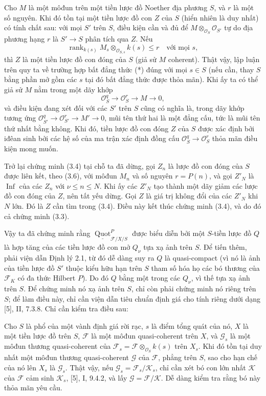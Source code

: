  Cho $M$ là một môđun trên một tiền lược đồ Noether địa
phương $S$, và $r$ là một số nguyên. Khi đó tồn tại một tiền lược đồ con $Z$
của $S$ (hiển nhiên là duy nhất) có tính chất sau: với mọi $S'$ trên $S$, điều
kiện cần và đủ để $M\otimes_{\mathcal O_S}\mathcal O_{S'}$ tự do địa phương
hạng $r$ là $S'\longrightarrow S$ phân tích qua $Z$. Nếu
\[
\operatorname{rank}_{k(s)}
M_s\otimes_{\mathcal O_{S,s}}k(s)\leq r
\quad\text{với mọi $s$},
\]
thì $Z$ là một tiền lược đồ con đóng của $S$ (giả sử $M$ coherent).
Thật vậy, lập luận trên quy ta về trường hợp bất đẳng thức (*) đúng với mọi
$s\in S$ (nếu cần, thay $S$ bằng phần mở gồm các $s$ tại đó bất đẳng thức
được thỏa mãn). Khi ấy ta có thể giả sử $M$ nằm trong một dãy khớp
\[
\mathcal O_S^q\longrightarrow\mathcal O_S^r\longrightarrow M\longrightarrow0,
\]
và điều kiện đang xét đối với các $S'$ trên $S$ cũng có nghĩa là, trong dãy
khớp tương ứng $\mathcal O_{S'}^q\longrightarrow\mathcal O_{S'}^r
\longrightarrow M'\longrightarrow0$, mũi tên thứ hai là một đẳng cấu, tức là
mũi tên thứ nhất bằng không. Khi đó, tiền lược đồ con đóng $Z$ của $S$ được
xác định bởi iđêan sinh bởi các hệ số của ma trận xác định đồng cấu
$\mathcal O_S^q\longrightarrow\mathcal O_S^r$ thỏa mãn điều kiện mong muốn.

Trở lại chứng minh (3.4) tại chỗ ta đã dừng, gọi $Z_n$ là lược đồ con đóng
của $S$ được liên kết, theo (3.6), với môđun $M_n$ và số nguyên $r=P(n)$, và
gọi $Z'_N$ là $\operatorname{Inf}$ của các $Z_n$ với
$\nu\leq n\leq N$. Khi ấy các $Z'_N$ tạo thành một dãy giảm các lược đồ con
đóng của $Z$, nên tất yếu dừng. Gọi $Z$ là giá trị không đổi của các
$Z'_N$ khi $N$ lớn. Đó là $Z$ cần tìm trong (3.4). Điều này kết thúc chứng
minh (3.4), và do đó cả chứng minh (3.3).

Vậy ta đã chứng minh rằng
$\underline{\operatorname{Quot}}^P_{\mathcal F/X/S}$ được biểu diễn bởi một
$S$-tiền lược đồ $Q$ là hợp tăng của các tiền lược đồ con mở $Q_\nu$ tựa xạ
ảnh trên $S$. Để tiến thêm, phải viện dẫn Định lý 2.1, từ đó dễ dàng suy ra
$Q$ là quasi-compact (vì nó là ảnh của tiền lược đồ $S'$ thuộc kiểu hữu hạn
trên $S$ tham số hóa họ các bó thương của $\mathcal F_K$ có đa thức Hilbert
$P$). Do đó $Q$ bằng một trong các $Q_\nu$, vì thế tựa xạ ảnh trên $S$. Để
chứng minh nó xạ ảnh trên $S$, chỉ còn phải chứng minh nó riêng trên $S$; để
làm điều này, chỉ cần viện dẫn tiêu chuẩn định giá cho tính riêng dưới dạng
[5], II, 7.3.8. Chỉ cần kiểm tra điều sau:

 Cho $S$ là phổ của một vành định giá rời rạc, $s$ là điểm
tổng quát của nó, $X$ là một tiền lược đồ trên $S$, $\mathcal F$ là một môđun
quasi-coherent trên $X$, và $\mathcal G_s$ là một môđun thương quasi-coherent
của $\mathcal F_s=\mathcal F\otimes_{\mathcal O_S}k(s)$ trên $X_s$. Khi đó
tồn tại duy nhất một môđun thương quasi-coherent $\mathcal G$ của
$\mathcal F$, phẳng trên $S$, sao cho hạn chế của nó lên $X_s$ là
$\mathcal G_s$.
Thật vậy, nếu $\mathcal G_s=\mathcal F_s/\mathcal K_s$, chỉ cần xét bó con lớn
nhất $\mathcal K$ của $\mathcal F$ cảm sinh $\mathcal K_s$, [5], I, 9.4.2, và
lấy $\mathcal G=\mathcal F/\mathcal K$. Dễ dàng kiểm tra rằng bó này thỏa mãn
yêu cầu.


